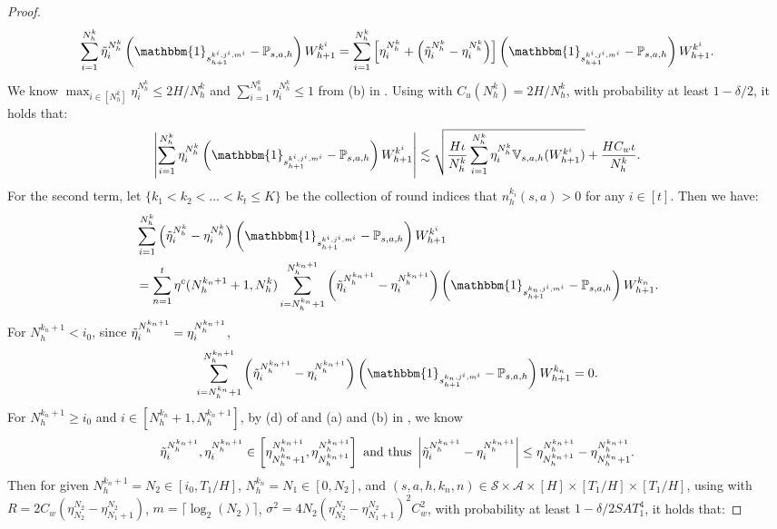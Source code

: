 \documentclass{article}
\newcommand{\sah}{\mathcal{S} \times \mathcal{A} \times [H]}
\begin{document}
\begin{proof}
    $$\sum_{i=1} ^{N_h^k} \Tilde{\eta}_i^{N_h^k} \left(\mathbbm{1}_{s_{h+1}^{k^i,j^i,m^i}} - \mathbb{P}_{s,a,h}\right)W_{h+1}^{k^i} = \sum_{i=1} ^{N_h^k} \left[\eta_i^{N_h^k}+\left(\Tilde{\eta}_i^{N_h^k}-\eta_i^{N_h^k}\right)\right]  \left(\mathbbm{1}_{s_{h+1}^{k^i,j^i,m^i}} - \mathbb{P}_{s,a,h}\right)W_{h+1}^{k^i}.$$
    We know $\max_{i\in [N_h^k]}\eta_i^{N_h^k}\leq 2H/N_h^k $ and $\sum_{i=1}^{N_h^k}\eta_i^{N_h^k} \leq 1$ from (b) in . Using  with $C_u(N_h^k) = 2H/N_h^k$, with probability at least $1-\delta/2$, it holds that:
    \begin{equation}
    \label{etadiff}
        \left|\sum_{i=1} ^{N_h^k} \eta_i^{N_h^k} \left(\mathbbm{1}_{s_{h+1}^{k^i,j^i,m^i}} - \mathbb{P}_{s,a,h}\right)W_{h+1}^{k^i}\right| \lesssim \sqrt{\frac{H\iota}{N_h^k} \sum_{i=1}^{N_h^k} \eta_i^{N_h^k} \mathbb{V}_{s,a,h}(W_{h+1}^{k^i})} + \frac{HC_w\iota}{N_h^k}.
    \end{equation}
    For the second term, let $\{k_1 < k_2 <...<k_t \leq K\}$ be the collection of round indices that $n_h^{k_i}(s,a) > 0$ for any $i \in [t]$. Then we have:
    \begin{align}
    \label{nonmiddle}
        &\sum_{i=1} ^{N_h^k} \left(\Tilde{\eta}_i^{N_h^k}-\eta_i^{N_h^k}\right)\left(\mathbbm{1}_{s_{h+1}^{k^i,j^i,m^i}} - \mathbb{P}_{s,a,h}\right)W_{h+1}^{k^i} \nonumber\\
        &= \sum_{n=1}^{t}\eta^c(N_h^{k_n+1}+1,N_h^k)\sum_{i=N_h^{k_n}+1}^{N_h^{k_n+1}}\left(\Tilde{\eta}_i^{N_h^{k_n+1}}-\eta_i^{N_h^{k_n+1}}\right)\left(\mathbbm{1}_{s_{h+1}^{k_n,j^i,m^i}} - \mathbb{P}_{s,a,h}\right)W_{h+1}^{k_n}.
    \end{align}
    For $N_h^{k_n+1} <i_0$, 
    since $\Tilde{\eta}_i^{N_h^{k_n+1}}=\eta_i^{N_h^{k_n+1}}$,
    $$\sum_{i=N_h^{k_n}+1}^{N_h^{k_n+1}}\left(\Tilde{\eta}_i^{N_h^{k_n+1}}-\eta_i^{N_h^{k_n+1}}\right)\left(\mathbbm{1}_{s_{h+1}^{k_n,j^i,m^i}} - \mathbb{P}_{s,a,h}\right)W_{h+1}^{k_n} = 0.$$
    For $N_h^{k_n+1} \geq i_0$ and $i \in [N_h^{k_n}+1, N_h^{k_n+1}]$, by (d) of  and (a) and (b) in , we know
    $$\Tilde{\eta}_i^{N_h^{k_n+1}},\eta_i^{N_h^{k_n+1}} \in \left[\eta_{N_h^{k_n}+1}^{N_h^{k_n+1}}, \eta_{N_h^{k_n+1}}^{N_h^{k_n+1}}\right] \textnormal{ and thus }\left|\Tilde{\eta}_i^{N_h^{k_n+1}}-\eta_i^{N_h^{k_n+1}}\right| \leq \eta_{N_h^{k_n+1}}^{N_h^{k_n+1}}-\eta_{N_h^{k_n}+1}^{N_h^{k_n+1}}.$$
    Then for given $N_h^{k_n+1} = N_2 \in [i_0,T_1/H]$, $N_h^{k_n} = N_1 \in [0,N_2]$,  and $(s,a,h,k_n,n)\in \sah \times [T_1/H]\times [T_1/H]$, using  with $R = 2C_w(\eta_{N_2}^{N_2}-\eta_{N_1+1}^{N_2})$, $m = \lceil\log_2(N_2)\rceil$, $\sigma^2 = 4N_2(\eta_{N_2}^{N_2}-\eta_{N_1+1}^{N_2})^2C_w^2$, with probability at least $1- \delta/ 2SAT_1^4$, it holds that:

\end{proof}
\end{document}

